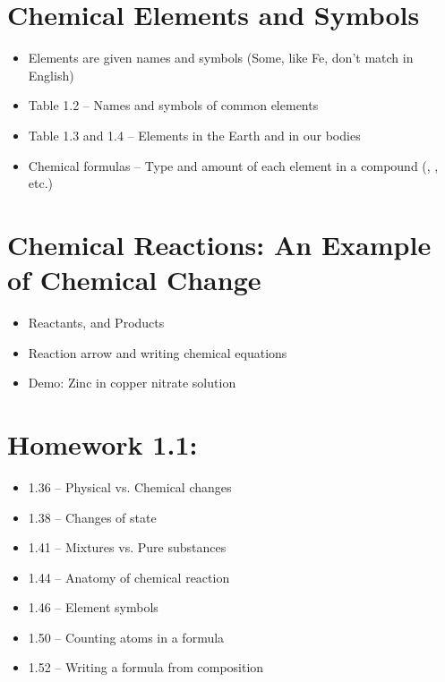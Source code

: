 \documentclass[12pt, openany, letterpaper]{memoir}
\begin{document}
\section{Chemical Elements and Symbols}
\begin{itemize}
	\item Elements are given names and symbols (Some, like Fe, don't match in English)
	\item Table 1.2 -- Names and symbols of common elements
	\item Table 1.3 and 1.4 -- Elements in the Earth and in our bodies
	\item Chemical formulas -- Type and amount of each element in a compound (, , etc.)
\end{itemize}

\section{Chemical Reactions: An Example of Chemical Change}
\begin{itemize}
	\item Reactants, and Products
	\item Reaction arrow and writing chemical equations
	\item Demo: Zinc in copper nitrate solution
\end{itemize}

\section*{Homework 1.1:}
\begin{itemize}
	\item 1.36 -- Physical vs. Chemical changes
	\item 1.38 -- Changes of state
	\item 1.41 -- Mixtures vs. Pure substances
	\item 1.44 -- Anatomy of chemical reaction
	\item 1.46 -- Element symbols
	\item 1.50 -- Counting atoms in a formula
	\item 1.52 -- Writing a formula from composition
\end{itemize}
\end{document}
